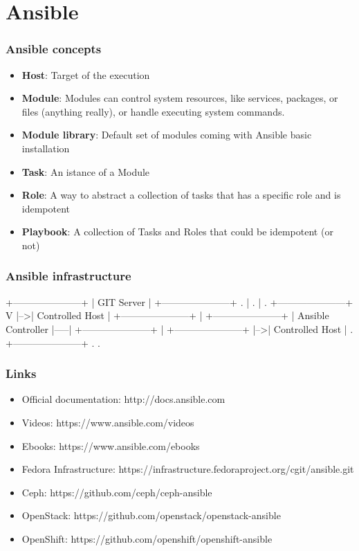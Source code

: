 \documentclass[t,aspectratio=169]{beamer}
\begin{document}
\section{Ansible}
\begin{frame}
    \frametitle{Ansible concepts}
    \begin{itemize}
        \item<2->\textbf{Host}: Target of the execution
        \item<3->\textbf{Module}: Modules can control system resources, like services, packages, or files (anything really), or handle executing system commands.
        \item<4->\textbf{Module library}: Default set of modules coming with Ansible basic installation
        \item<5->\textbf{Task}: An istance of a Module 
        \item<6->\textbf{Role}: A way to abstract a collection of tasks that has a specific role and is idempotent
        \item<7->\textbf{Playbook}: A collection of Tasks and Roles that could be idempotent (or not)
    \end{itemize}
\end{frame}

\begin{frame}[fragile]
    \frametitle{Ansible infrastructure}
    \begin{semiverbatim}
+---------------------+
|     GIT Server      |
+---------------------+     .
           |                .
           |                .   +---------------------+
           V                |-->|   Controlled Host   |
+---------------------+     |   +---------------------+
| Ansible Controller  |-----|
+---------------------+     |   +---------------------+
                            |-->|   Controlled Host   |
                            .   +---------------------+
                            .
                            .
    \end{semiverbatim}
\end{frame}

\begin{frame}
    \frametitle{Links}
    \begin{itemize}
        \item Official documentation: http://docs.ansible.com
        \item Videos: https://www.ansible.com/videos
        \item Ebooks: https://www.ansible.com/ebooks
        \item Fedora Infrastructure: https://infrastructure.fedoraproject.org/cgit/ansible.git
        \item Ceph: https://github.com/ceph/ceph-ansible
        \item OpenStack: https://github.com/openstack/openstack-ansible
        \item OpenShift: https://github.com/openshift/openshift-ansible
    \end{itemize}
\end{frame}

\end{document}
